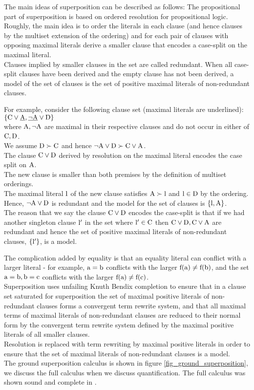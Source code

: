 \noindent
The main ideas of superposition can be described as follows:
The propositional part of superposition is based on ordered resolution for propositional logic.
Roughly, the main idea is to order the literals in each clause (and hence clauses by the multiset extension of the ordering) and for each pair of clauses with opposing maximal literals derive a smaller clause that encodes a case-split on the maximal literal.\\
Clauses implied by smaller clauses in the set are called redundant. When all case-split clauses have been derived and the empty clause has not been derived, a model of the set of clauses is the set of positive maximal literals of non-redundant clauses.

\noindent
For example, consider the following clause set (maximal literals are underlined):\\
$\left\{\mathrm{C \lor \underline{A}, \underline{\lnot A} \lor D}\right\}$ \\
where $\mathrm{A,\lnot A}$ are maximal in their respective clauses and do not occur in either of $\mathrm{C,D}$.\\
We assume $\mathrm{D \succ C}$ and hence $\mathrm{\lnot A \lor D \succ C \lor A}$.\\
The clause $\mathrm{C\lor D}$ derived by resolution on the maximal literal encodes the case split on $\mathrm{A}$.\\
The new clause is smaller than both premises by the definition of multiset orderings.\\
The maximal literal $\mathrm{l}$ of the new clause satisfies $\mathrm{A \succ l}$ and $\mathrm{l \in D}$ by the ordering.\\
Hence, $\mathrm{\lnot A \lor D}$ is redundant and the model for the set of clauses is $\left\{\mathrm{l,A}\right\}$.\\
The reason that we say the clause $\mathrm{C \lor D}$ encodes the case-split is that if we had another singleton clause $\mathrm{l'}$ in the set where $\mathrm{l' \in C}$ then $\mathrm{C \lor D,C \lor A}$ are redundant and hence the set of positive maximal literals of non-redundant clauses, $\left\{\mathrm{l'}\right\}$, is a model.

\noindent
The complication added by equality is that an equality literal can conflict with a larger literal - for example, $\mathrm{a=b}$ conflicts with the larger $\mathrm{f(a)\neq f(b)}$, and the set $\mathrm{a=b,b=c}$ conflicts with the larger $\mathrm{f(a)\neq f(c)}$.\\
Superposition uses unfailing Knuth Bendix completion to ensure that in a clause set saturated for superposition the set of maximal positive literals of non-redundant clauses forms a convergent term rewrite system, and that all maximal terms of maximal literals of non-redundant clauses are reduced to their normal form by the  convergent term rewrite system defined by the maximal positive literals of all smaller clauses.\\
Resolution is replaced with term rewriting by maximal positive literals in order to ensure that the set of maximal literals of non-redundant clauses is a model.\\
The ground superposition calculus is shown in figure \ref{fig_ground_superposition}, we discuss the full calculus when we discuss quantification. The full calculus was shown sound and complete in \cite{BachmairGanzinger94}.

